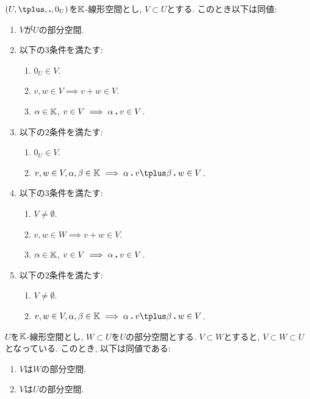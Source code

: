 \begin{lemma}
  $(U,\plus ,\act,0_U)$を$\mathbb{K}$-線形空間とし, $V\subset U$とする.
  このとき以下は同値:
  \begin{enumerate}
  \item $V$が$U$の部分空間.
  \item 以下の$3$条件を満たす:
    \begin{enumerate}
  \item $0_U\in V$.
  \item $v,w\in V \implies v\plus w\in V$.
  \item $\alpha\in\mathbb{K}$, $v\in V \implies \alpha\mathbin{\boldsymbol{.}} v\in V$.
    \end{enumerate}
  \item 以下の$2$条件を満たす:
    \begin{enumerate}
  \item $0_U\in V$.
  \item $v,w\in V, \alpha,\beta\in\KK \implies \alpha\act v\plus \beta\act w\in V$.
    \end{enumerate}
  \item 以下の$3$条件を満たす:
    \begin{enumerate}
  \item $V\neq \emptyset$.
  \item $v,w\in W \implies v\plus w\in V$.
  \item $\alpha\in\mathbb{K}$, $v\in V \implies \alpha\mathbin{\boldsymbol{.}} v\in V$.
    \end{enumerate}
  \item 以下の$2$条件を満たす:
    \begin{enumerate}
  \item $V\neq \emptyset$.
  \item $v,w\in V, \alpha,\beta\in\KK \implies \alpha\act v\plus \beta\act w\in V$.
    \end{enumerate}
  \end{enumerate}
\end{lemma}

\begin{remark}
$U$を$\mathbb{K}$-線形空間とし,
$W\subset U$を$U$の部分空間とする.
$V\subset W$とすると,
$V\subset W\subset U$となっている.
このとき, 以下は同値である:
\begin{enumerate}
\item $V$は$W$の部分空間.
\item $V$は$U$の部分空間.
\end{enumerate}
\end{remark}


